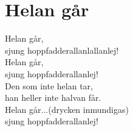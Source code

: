 \section{Helan går}
Helan går,\\
sjung hoppfadderallanlallanlej!\\
Helan går,\\
sjung hoppfadderallanlej!\\
Den som inte helan tar,\\
han heller inte halvan får.\\
Helan går...(drycken inmundigas)\\
sjung hoppfadderallanlej!\\